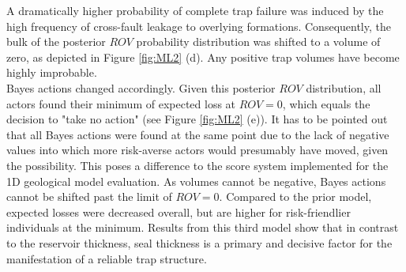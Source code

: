 		A dramatically higher probability of complete trap failure was induced by the high frequency of cross-fault leakage to overlying formations. Consequently, the bulk of the posterior $ROV$ probability distribution was shifted to a volume of zero, as depicted in Figure \ref{fig:ML2} (d). Any positive trap volumes have become highly improbable.\\
		Bayes actions changed accordingly. Given this posterior $ROV$ distribution, all actors found their minimum of expected loss at $ROV = 0$, which equals the decision to "take no action" (see Figure \ref{fig:ML2} (e)). It has to be pointed out that all Bayes actions were found at the same point due to the lack of negative values into which more risk-averse actors would presumably have moved, given the possibility. This poses a difference to the score system implemented for the 1D geological model evaluation. As volumes cannot be negative, Bayes actions cannot be shifted past the limit of $ROV = 0$. Compared to the prior model, expected losses were decreased overall, but are higher for risk-friendlier individuals at the minimum. Results from this third model show that in contrast to the reservoir thickness, seal thickness is a primary and decisive factor for the manifestation of a reliable trap structure.
		
